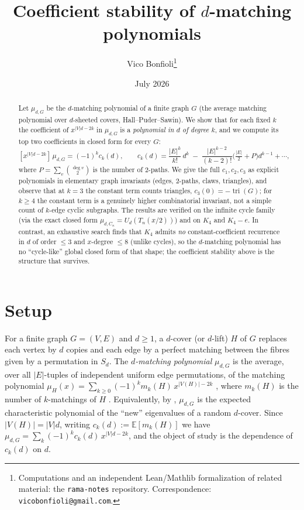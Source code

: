\documentclass[11pt]{article}
\title{Coefficient stability of $d$-matching polynomials}
\author{Vico Bonfioli\thanks{Computations and an independent Lean/Mathlib
formalization of related material: the \texttt{rama-notes} repository. Correspondence: \texttt{vicobonfioli@gmail.com}.}}
\date{July 2026}
\theoremstyle{remark}
\newcommand{\E}{\mathbb{E}}
\DeclareMathOperator{\tri}{tri}
\begin{document}
\maketitle

\begin{abstract}
Let $\mu_{d,G}$ be the $d$-matching polynomial of a finite graph $G$ (the
average matching polynomial over $d$-sheeted covers, Hall--Puder--Sawin). We
show that for each fixed $k$ the coefficient of $x^{|V|d-2k}$ in $\mu_{d,G}$ is a
\emph{polynomial in $d$ of degree $k$}, and we compute its top two coefficients
in closed form for every $G$:
\[
[x^{|V|d-2k}]\,\mu_{d,G} = (-1)^k c_k(d),\qquad
c_k(d) = \frac{|E|^k}{k!}\,d^k \;-\; \frac{|E|^{k-2}}{(k-2)!}\Big(\tfrac{|E|}{2}+P\Big)d^{k-1}
+ \cdots ,
\]
where $P=\sum_v \binom{\deg v}{2}$ is the number of $2$-paths. We give the full
$c_1,c_2,c_3$ as explicit polynomials in elementary graph invariants (edges,
$2$-paths, claws, triangles), and observe that at $k=3$ the constant term counts
triangles, $c_3(0)=-\tri(G)$; for $k\ge4$ the constant term is a genuinely higher
combinatorial invariant, not a simple count of $k$-edge cyclic subgraphs.
The results are verified on the infinite cycle family (via the exact closed form
$\mu_{d,C_n}=U_d(T_n(x/2))$) and on $K_4$ and $K_4-e$. In contrast, an exhaustive
search finds that $K_4$ admits \emph{no} constant-coefficient recurrence in $d$ of
order $\le3$ and $x$-degree $\le8$ (unlike cycles), so the $d$-matching polynomial
has no ``cycle-like'' global closed form of that shape; the coefficient stability
above is the structure that survives.
\end{abstract}

\section{Setup}

For a finite graph $G=(V,E)$ and $d\ge 1$, a $d$-cover (or $d$-lift) $H$ of $G$
replaces each vertex by $d$ copies and each edge by a perfect matching between
the fibres given by a permutation in $S_d$. The \emph{$d$-matching polynomial}
$\mu_{d,G}$ is the average, over all $|E|$-tuples of independent uniform edge
permutations, of the matching polynomial $\mu_H(x)=\sum_{k\ge0}(-1)^k m_k(H)\,
x^{|V(H)|-2k}$ \cite{GG}, where $m_k(H)$ is the number of $k$-matchings of $H$
\cite{HPS}. Equivalently, by \cite{HPS}, $\mu_{d,G}$ is the expected
characteristic polynomial of the ``new'' eigenvalues of a random $d$-cover.
Since $|V(H)|=|V|d$, writing $c_k(d):=\E[m_k(H)]$ we have
$\mu_{d,G}=\sum_k (-1)^k c_k(d)\, x^{|V|d-2k}$, and the object of study is the
dependence of $c_k(d)$ on $d$.
\end{document}
